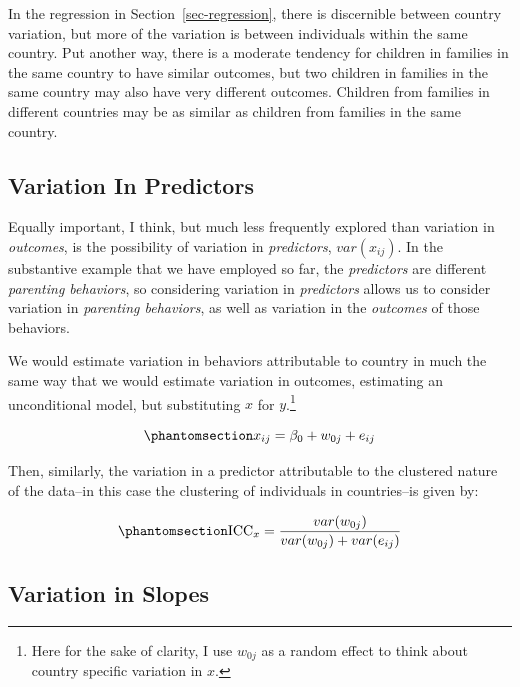 \documentclass[
  letterpaper,
  DIV=11,
  numbers=noendperiod]{scrreprt}
\begin{document}
In the regression in Section~\ref{sec-regression}, there is discernible
between country variation, but more of the variation is between
individuals within the same country. Put another way, there is a
moderate tendency for children in families in the same country to have
similar outcomes, but two children in families in the same country may
also have very different outcomes. Children from families in different
countries may be as similar as children from families in the same
country.

\subsection{Variation In Predictors}\label{variation-in-predictors}

Equally important, I think, but much less frequently explored than
variation in \emph{outcomes}, is the possibility of variation in
\emph{predictors}, \(var(x_{ij})\). In the substantive example that we
have employed so far, the \emph{predictors} are different
\emph{parenting behaviors}, so considering variation in
\emph{predictors} allows us to consider variation in \emph{parenting
behaviors}, as well as variation in the \emph{outcomes} of those
behaviors. 

We would estimate variation in behaviors attributable to country in much
the same way that we would estimate variation in outcomes, estimating an
unconditional model, but substituting \(x\) for \(y\).\footnote{Here for
  the sake of clarity, I use \(w_{0j}\) as a random effect to think
  about country specific variation in \(x\).}

\begin{equation}\phantomsection\label{eq-unconditionalx}{x_{ij} = \beta_0 + w_{0j} + e_{ij}}\end{equation}

Then, similarly, the variation in a predictor attributable to the
clustered nature of the data--in this case the clustering of individuals
in countries--is given by:

\begin{equation}\phantomsection\label{eq-ICCx}{\text{ICC}_x = \frac{var(w_{0j})}{var(w_{0j}) + var(e_{ij})}}\end{equation}

\subsection{Variation in Slopes}\label{variation-in-slopes}
\end{document}
